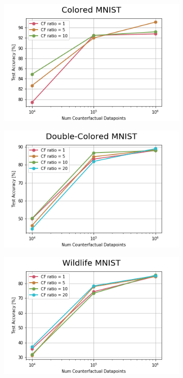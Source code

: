 \begin{appendices}
\begin{figure}[h!]
     \centering
     \begin{subfigure}{0.3\linewidth}
         \centering
         \includegraphics[width=\textwidth]{../openreview/images/image-085.png}
     \end{subfigure}
     \begin{subfigure}{0.3\linewidth}
         \centering
         \includegraphics[width=\textwidth]{../openreview/images/image-087.png}
     \end{subfigure}
     \begin{subfigure}{0.3\linewidth}
         \centering
         \includegraphics[width=\textwidth]{../openreview/images/image-089.png}

\end{subfigure}
\end{figure}
\end{appendices}
